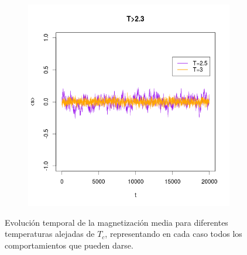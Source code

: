 \documentclass{scrartcl}
\begin{document}
\begin{figure}[ht]
\begin{subfigure}{.5\textwidth}
\end{subfigure}
\begin{subfigure}{.5\textwidth}
  \centering
  \includegraphics[width=1\linewidth]{T3}
\end{subfigure}
\caption{Evolución temporal de la magnetización media para diferentes temperaturas alejadas de $T_c$, representando en cada caso todos los comportamientos que pueden darse.}
\label{fig:tempnoTc}
\end{figure}
\end{document}
